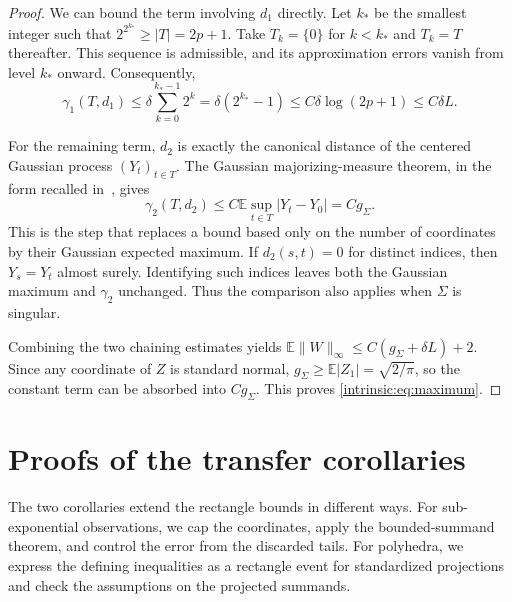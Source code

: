 \documentclass[11pt,letterpaper]{article}
\theoremstyle{remark}
\newcommand{\E}{\mathbb E}
\begin{document}
\begin{proof}
We can bound the term involving $d_1$ directly.
Let $k_*$ be the smallest integer such that
$2^{2^{k_*}}\ge|T|=2p+1$.
Take $T_k=\{0\}$ for $k<k_*$ and $T_k=T$ thereafter.
This sequence is admissible, and its approximation errors vanish
from level $k_*$ onward. Consequently,
\[
 \gamma_1(T,d_1)
 \le\delta\sum_{k=0}^{k_*-1}2^k
 =\delta(2^{k_*}-1)
 \le C\delta\log(2p+1)\le C\delta L.
\]

For the remaining term, $d_2$ is exactly the canonical distance
of the centered Gaussian process $(Y_t)_{t\in T}$.
The Gaussian majorizing-measure theorem, in the form recalled
in~\cite[Remark~3.3(i)]{Dirksen2015}, gives
\[
 \gamma_2(T,d_2)
 \le C\E\sup_{t\in T}|Y_t-Y_0|=Cg_\Sigma.
\]
This is the step that replaces a bound based only on the number of
coordinates by their Gaussian expected maximum.
If $d_2(s,t)=0$ for distinct indices, then $Y_s=Y_t$ almost surely.
Identifying such indices leaves both the Gaussian maximum and
$\gamma_2$ unchanged. Thus the comparison also applies when
$\Sigma$ is singular.

Combining the two chaining estimates yields
$\E\|W\|_\infty\le C(g_\Sigma+\delta L)+2$.
Since any coordinate of $Z$ is standard normal,
$g_\Sigma\ge\E|Z_1|=\sqrt{2/\pi}$, so the constant term can be
absorbed into $Cg_\Sigma$. This proves
\eqref{intrinsic:eq:maximum}.
\end{proof}


\section{Proofs of the transfer corollaries}\label{app:transfers}

The two corollaries extend the rectangle bounds in different ways.
For sub-exponential observations, we cap the coordinates, apply the
bounded-summand theorem, and control the error from the discarded tails.
For polyhedra, we express the defining inequalities as a rectangle
event for standardized projections and check the assumptions on the
projected summands.
\end{document}

